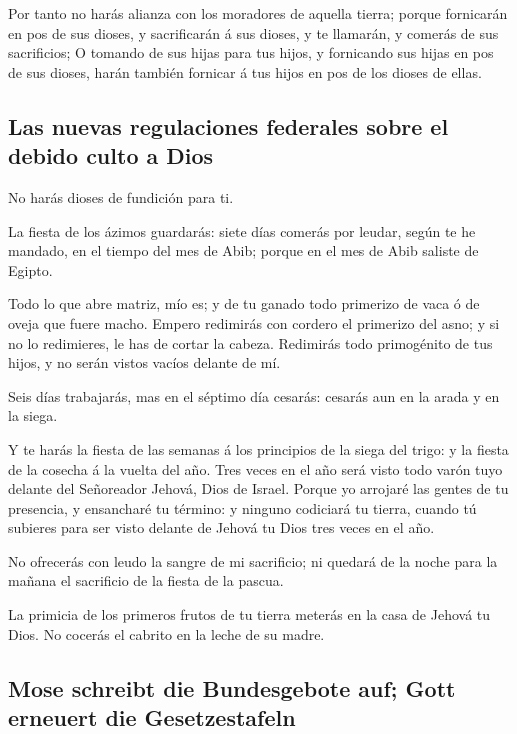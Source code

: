  Por tanto no harás alianza con los moradores de aquella
tierra; porque fornicarán en pos de sus dioses, y sacrificarán á sus
dioses, y te llamarán, y comerás de sus sacrificios;  O
tomando de sus hijas para tus hijos, y fornicando sus hijas en pos de
sus dioses, harán también fornicar á tus hijos en pos de los dioses de
ellas.

\hypertarget{las-nuevas-regulaciones-federales-sobre-el-debido-culto-a-dios}{%
\subsection{Las nuevas regulaciones federales sobre el debido culto a
Dios}\label{las-nuevas-regulaciones-federales-sobre-el-debido-culto-a-dios}}

 No harás dioses de fundición para ti.

 La fiesta de los ázimos guardarás: siete días comerás por
leudar, según te he mandado, en el tiempo del mes de Abib; porque en el
mes de Abib saliste de Egipto.

 Todo lo que abre matriz, mío es; y de tu ganado todo
primerizo de vaca ó de oveja que fuere macho.  Empero
redimirás con cordero el primerizo del asno; y si no lo redimieres, le
has de cortar la cabeza. Redimirás todo primogénito de tus hijos, y no
serán vistos vacíos delante de mí.

 Seis días trabajarás, mas en el séptimo día cesarás:
cesarás aun en la arada y en la siega.

 Y te harás la fiesta de las semanas á los principios de la
siega del trigo: y la fiesta de la cosecha á la vuelta del año.
 Tres veces en el año será visto todo varón tuyo delante
del Señoreador Jehová, Dios de Israel.  Porque yo arrojaré
las gentes de tu presencia, y ensancharé tu término: y ninguno codiciará
tu tierra, cuando tú subieres para ser visto delante de Jehová tu Dios
tres veces en el año.

 No ofrecerás con leudo la sangre de mi sacrificio; ni
quedará de la noche para la mañana el sacrificio de la fiesta de la
pascua.

 La primicia de los primeros frutos de tu tierra meterás en
la casa de Jehová tu Dios. No cocerás el cabrito en la leche de su
madre.

\hypertarget{mose-schreibt-die-bundesgebote-auf-gott-erneuert-die-gesetzestafeln}{%
\subsection{Mose schreibt die Bundesgebote auf; Gott erneuert die
Gesetzestafeln}\label{mose-schreibt-die-bundesgebote-auf-gott-erneuert-die-gesetzestafeln}}


